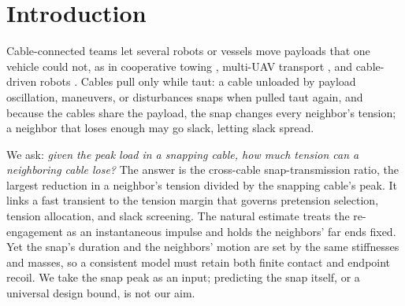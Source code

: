 \section{Introduction}\label{sec:intro}

Cable-connected teams let several robots or vessels move payloads that one vehicle could not, as in cooperative towing \cite{esposito2008cooperative, cheng2009cooperative, du2021cooperative}, multi-UAV transport \cite{sreenath2013dynamics, hajieghrary2026passive}, and cable-driven robots \cite{carricato2013stability}. Cables pull only while taut: a cable unloaded by payload oscillation, maneuvers, or disturbances snaps when pulled taut again, and because the cables share the payload, the snap changes every neighbor's tension; a neighbor that loses enough may go slack, letting slack spread.

We ask: \emph{given the peak load in a snapping cable, how much tension can a neighboring cable lose?} The answer is the cross-cable snap-transmission ratio, the largest reduction in a neighbor's tension divided by the snapping cable's peak. It links a fast transient to the tension margin that governs pretension selection, tension allocation, and slack screening. The natural estimate treats the re-engagement as an instantaneous impulse and holds the neighbors' far ends fixed. Yet the snap's duration and the neighbors' motion are set by the same stiffnesses and masses, so a consistent model must retain both finite contact and endpoint recoil. We take the snap peak as an input; predicting the snap itself, or a universal design bound, is not our aim.

